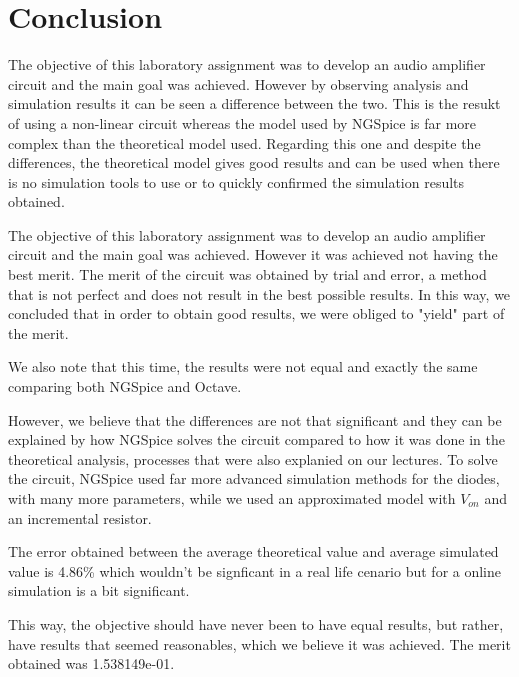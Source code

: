 \newpage
\section{Conclusion}
\label{sec:conclusion}

\par The objective of this laboratory assignment was to develop an audio amplifier circuit and the main goal was achieved. However by observing analysis and simulation results it can be seen a difference between the two. This is the resukt of using a non-linear circuit whereas the model used by NGSpice is far more complex than the theoretical model used. Regarding this one and despite the differences, the theoretical model gives good results and can be used when there is no simulation tools to use or to quickly confirmed the simulation results obtained.
\par







The objective of this laboratory assignment was to develop an audio amplifier circuit and the main goal was achieved. However it was achieved not having the best merit. The merit of the circuit was obtained by trial and error, a method that is not perfect and does not result in the best possible results. In this way, we concluded that in order to obtain good results, we were obliged to "yield" part of the merit.

We also note that this time, the results were not equal and exactly the same comparing both NGSpice and Octave.

However, we believe that the differences are not that significant and they can be explained by how NGSpice solves the circuit compared to how it was done in the theoretical analysis, processes that were also explanied on our lectures. To solve the circuit, NGSpice used far more advanced simulation methods for the diodes, with many more parameters, while we used an approximated model with $V_{on}$ and an incremental resistor. 

The error obtained between the average theoretical value and average simulated value is 4.86\% which wouldn't be signficant in a real life cenario but for a online simulation is a bit significant.

This way, the objective should have never been to have equal results, but rather, have results that seemed reasonables, which we believe it was achieved. The merit obtained was 1.538149e-01.


